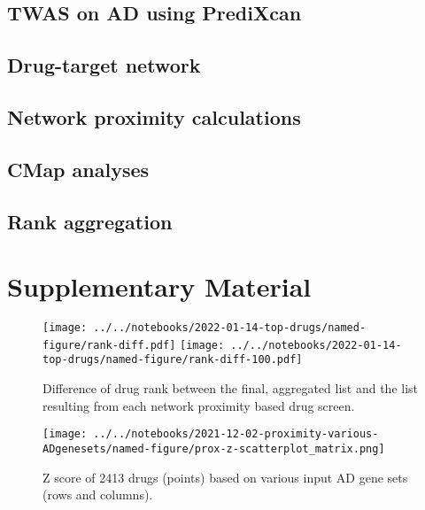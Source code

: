 \documentclass[letterpaper]{article}
\begin{document}
\subsection{TWAS on AD using PrediXcan}

\subsection{Drug-target network}

\subsection{Network proximity calculations}

\subsection{CMap analyses}

\subsection{Rank aggregation}



\section*{Supplementary Material}

\setcounter{table}{0}
\makeatletter 
\renewcommand{\figurename}{Supplementary Table} %
\makeatother

\setcounter{figure}{0}
\makeatletter 
\renewcommand{\figurename}{Supplementary Figure} %
\makeatother

\begin{figure}[p]
\texttt{[image: ../../notebooks/2022-01-14-top-drugs/named-figure/rank-diff.pdf]}
\texttt{[image: ../../notebooks/2022-01-14-top-drugs/named-figure/rank-diff-100.pdf]}
\caption{
Difference of drug rank between the final, aggregated list and the list
resulting from each network proximity based drug screen.
}
\label{fig:rank-diff}
\end{figure}

\begin{figure}[p]
\texttt{[image: ../../notebooks/2021-12-02-proximity-various-ADgenesets/named-figure/prox-z-scatterplot\_matrix.png]}
\caption{
Z score of 2413 drugs (points) based on various input AD gene sets (rows and
columns).
}
\label{fig:prox-z-scatterplot-m}
\end{figure}
\end{document}
